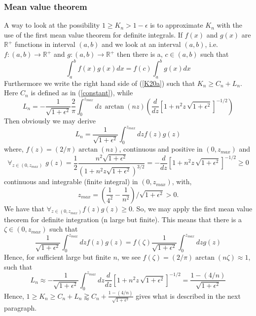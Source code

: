 \documentclass{appolb}
\begin{document}
\subsubsection{Mean value theorem}
A way to look at the possibility $1\geq K_n >1-\epsilon$ is to approximate $K_n$ with the use of the first mean value theorem for definite integrals. 
If $f(x)$ and $g(x)$ are $\mathbb{R}^{+}$ functions in interval $(a,b)$ and we look at an interval $(a,b)$, i.e. $f:(a,b)\rightarrow \mathbb{R}^{+}$ and $g:(a,b)\rightarrow \mathbb{R}^{+}$ then there is a, $c \in (a,b)$ such that
\[
\int_a^b f(x)g(x) dx =f(c)\int_a^b g(x) dx
\]
Furthermore we write the right hand side of (\ref{K20a}) such that $K_n \geq C_n + L_n$. Here $C_n$ is defined as in (\ref{constant}), while 
\begin{equation}\label{ad1}
L_n = -\frac{1}{\sqrt{1+\epsilon^2}}\frac{2}{\pi} \int_0^{z_{max}}dz\, \arctan(nz)\left( \frac{d}{dz}\left[ 1+n^2z\,\sqrt{1+\epsilon^2} \right]^{-1/2} \right)
\end{equation}
Then obviously we may derive
\begin{equation}\label{ad2}
L_n=\frac{1}{\sqrt{1+\epsilon^2}}\int_0^{z_{max}}dz f(z)g(z)
\end{equation}
where, $f(z)=(2/\pi)\arctan(nz)$, continuous and positive in $(0,z_{max})$ and 
\[
\forall_{z \in (0,z_{max})}\,\,
g(z)=\frac{1}{2}\frac{n^2\sqrt{1+\epsilon^2}}{\left(1+n^2 z \sqrt{1+\epsilon^2}\right)^{3/2}}=-\frac{d}{dz}\left[ 1+n^2z\,\sqrt{1+\epsilon^2} \right]^{-1/2} \geq 0
\]
continuous and integrable (finite integral) in $(0,z_{max})$, with, 
\[z_{max}=\left( \frac{1}{4^2}-\frac{1}{n^2} \right)/\sqrt{1+\epsilon^2}>0.\] We have that $\forall_{z\in (0,z_{max})}f(z)g(z)\geq 0$. So, we may apply the first mean value theorem for definite integration (n large but finite). This means that there is a $\zeta \in (0,z_{max})$ such that 
\begin{equation}\label{ad3}
\frac{1}{\sqrt{1+\epsilon^2}}\int_0^{z_{max}}dz f(z)g(z)=f(\zeta)\frac{1}{\sqrt{1+\epsilon^2}}\int_0^{z_{max}}dz g(z)
\end{equation}
Hence, for sufficient large but finite $n$, we see $f(\zeta)=(2/\pi)\arctan(n\zeta) \approx 1$, such that 
\begin{equation}\label{ad4}
L_n \approx-\frac{1}{\sqrt{1+\epsilon^2}} \int_0^{z_{max}}dz  \frac{d}{dz}\left[ 1+n^2z\,\sqrt{1+\epsilon^2} \right]^{-1/2} =\frac{1-(4/n)}{\sqrt{1+\epsilon^2}}
\end{equation}
Hence, $ 1 \geq K_n \geq  C_n + L_n \gtrapprox C_n +\frac{1-(4/n)}{\sqrt{1+\epsilon^2}}$ gives what is described in the next paragraph. 
\end{document}
